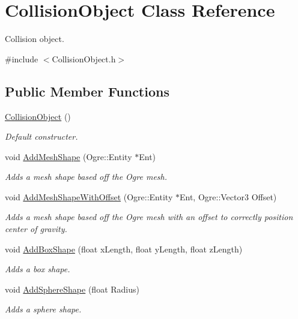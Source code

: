 \hypertarget{class_collision_object}{\section{Collision\-Object Class Reference}
\label{class_collision_object}
}


Collision object.  




{\ttfamily \#include $<$Collision\-Object.\-h$>$}

\subsection*{Public Member Functions}
\begin{DoxyCompactItemize}
\item 
\hyperlink{class_collision_object_a808493e22b7d12937464f4244ad7966a}{Collision\-Object} ()
\begin{DoxyCompactList}\small\item\em Default constructer. \end{DoxyCompactList}\item 
void \hyperlink{class_collision_object_ad556e9d6698b245c7691db5a2205ae6c}{Add\-Mesh\-Shape} (Ogre\-::\-Entity $\ast$Ent)
\begin{DoxyCompactList}\small\item\em Adds a mesh shape based off the Ogre mesh. \end{DoxyCompactList}\item 
void \hyperlink{class_collision_object_a11fbb95c3d71c6fe1b8d35cb512ba173}{Add\-Mesh\-Shape\-With\-Offset} (Ogre\-::\-Entity $\ast$Ent, Ogre\-::\-Vector3 Offset)
\begin{DoxyCompactList}\small\item\em Adds a mesh shape based off the Ogre mesh with an offset to correctly position center of gravity. \end{DoxyCompactList}\item 
void \hyperlink{class_collision_object_a41ba682403cabbaad6a9c5d33bb2e62c}{Add\-Box\-Shape} (float x\-Length, float y\-Length, float z\-Length)
\begin{DoxyCompactList}\small\item\em Adds a box shape. \end{DoxyCompactList}\item 
void \hyperlink{class_collision_object_a0df8a4a05b49e3fde9be693ac2187bd2}{Add\-Sphere\-Shape} (float Radius)
\begin{DoxyCompactList}\small\item\em Adds a sphere shape. \end{DoxyCompactList}\item 

\end{DoxyCompactItemize}
